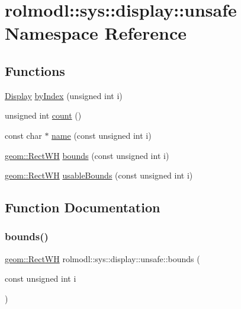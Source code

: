 \hypertarget{namespacerolmodl_1_1sys_1_1display_1_1unsafe}{}\section{rolmodl\+::sys\+::display\+::unsafe Namespace Reference}
\label{namespacerolmodl_1_1sys_1_1display_1_1unsafe}
\subsection*{Functions}
\begin{DoxyCompactItemize}
\item 
\mbox{\hyperlink{structrolmodl_1_1sys_1_1display_1_1_display}{Display}} \mbox{\hyperlink{namespacerolmodl_1_1sys_1_1display_1_1unsafe_a6821da893c862b8a0f3ac7e8a5a19010}{by\+Index}} (unsigned int i)
\item 
unsigned int \mbox{\hyperlink{namespacerolmodl_1_1sys_1_1display_1_1unsafe_a9f4b025c26e8e10d6e8256b40c69d173}{count}} ()
\item 
const char $\ast$ \mbox{\hyperlink{namespacerolmodl_1_1sys_1_1display_1_1unsafe_aed743db5c17811ec45e1212f729a4405}{name}} (const unsigned int i)
\item 
\mbox{\hyperlink{structrolmodl_1_1geom_1_1_rect_w_h}{geom\+::\+Rect\+WH}} \mbox{\hyperlink{namespacerolmodl_1_1sys_1_1display_1_1unsafe_a4a18b557573bfa7924e8c11122d0301f}{bounds}} (const unsigned int i)
\item 
\mbox{\hyperlink{structrolmodl_1_1geom_1_1_rect_w_h}{geom\+::\+Rect\+WH}} \mbox{\hyperlink{namespacerolmodl_1_1sys_1_1display_1_1unsafe_ad298fc79a292b5f66a81a818a38d2766}{usable\+Bounds}} (const unsigned int i)
\end{DoxyCompactItemize}


\subsection{Function Documentation}
\mbox{\label{namespacerolmodl_1_1sys_1_1display_1_1unsafe_a4a18b557573bfa7924e8c11122d0301f}} 
\subsubsection{\texorpdfstring{bounds()}{bounds()}}
{\footnotesize\ttfamily \mbox{\hyperlink{structrolmodl_1_1geom_1_1_rect_w_h}{geom\+::\+Rect\+WH}} rolmodl\+::sys\+::display\+::unsafe\+::bounds (\begin{DoxyParamCaption}\item[{const unsigned int}]{i }\end{DoxyParamCaption})}



